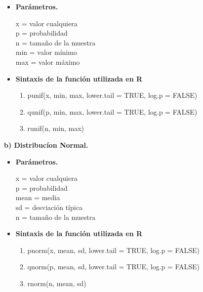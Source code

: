 \documentclass[12pt,letterpaper]{article}\usepackage[]{graphicx}\usepackage[]{color}
\begin{document}
\begin{itemize}
  \item \textbf{Par\'ametros.}
  \begin{center}
x = valor cualquiera\\ 
p = probabilidad\\
n = tama\~no de la muestra\\ 
min = valor m\'inimo\\ 
max = valor m\'aximo\\
\end{center}
\item \textbf{Sintaxis de la funci\'on utilizada en R}
\begin{enumerate}
  \item punif(x, min, max, lower.tail = TRUE, log.p = FALSE)
  \item qunif(p, min, max, lower.tail = TRUE, log.p = FALSE) 
  \item runif(n, min, max) 
\end{enumerate}
\end{itemize}

\begin{description}
  \item \textbf{b) Distribuc\'ion Normal.}\\
\end{description}

\begin{itemize}
  \item \textbf{Par\'ametros.}
  \begin{center}
x = valor cualquiera\\ 
p = probabilidad\\ 
mean = media\\ 
sd = desviación t\'ipica\\ 
n = tama\~no de la muestra\\ 
\end{center}
\item \textbf{Sintaxis de la funci\'on utilizada en R}
\begin{enumerate}
  \item pnorm(x, mean, sd, lower.tail = TRUE, log.p = FALSE) 
  \item qnorm(p, mean, sd, lower.tail = TRUE, log.p = FALSE) 
  \item rnorm(n, mean, sd)  
\end{enumerate}
\end{itemize}
\end{document}
